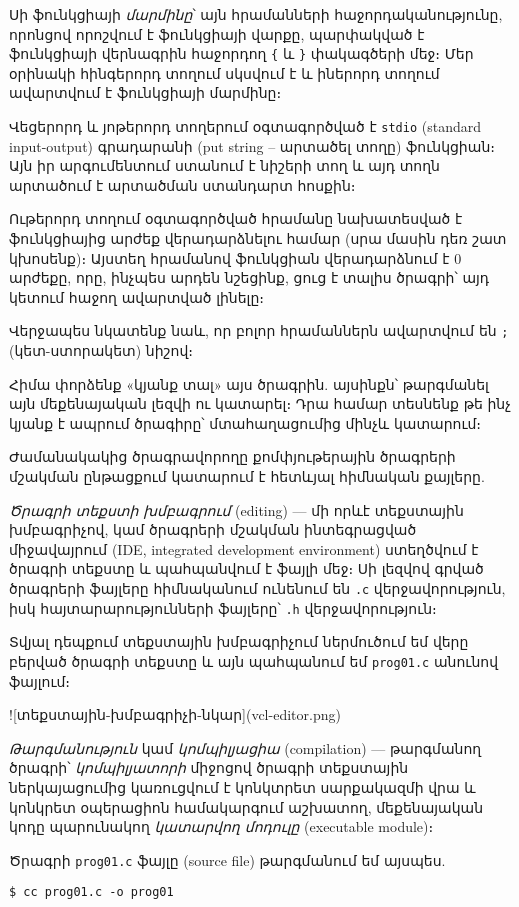 Սի ֆունկցիայի \emph{մարմինը}՝ այն հրամանների հաջորդականությունը,
որոնցով որոշվում է ֆունկցիայի վարքը, պարփակված է ֆունկցիայի
վերնագրին հաջորդող \Verb|{| և \Verb|}| փակագծերի մեջ։ Մեր օրինակի
հինգերորդ տողում սկսվում է և իներորդ տողում ավարտվում է
 ֆունկցիայի մարմինը։

Վեցերորդ և յոթերորդ տողերում օգտագործված է \texttt{stdio}
(standard input-output) գրադարանի  (put string --
արտածել տողը) ֆունկցիան։ Այն իր արգումենտում ստանում է նիշերի
տող և այդ տողն արտածում է  արտածման ստանդարտ հոսքին։

Ութերորդ տողում օգտագործված  հրամանը նախատեսված է
ֆունկցիայից արժեք վերադարձնելու համար (սրա մասին դեռ շատ կխոսենք)։
Այստեղ  հրամանով  ֆունկցիան վերադարձնում
է \(0\) արժեքը, որը, ինչպես արդեն նշեցինք, ցուց է տալիս ծրագրի՝
այդ կետում հաջող ավարտված լինելը։

Վերջապես նկատենք նաև, որ բոլոր հրամաններն ավարտվում են \verb|;|
(կետ-ստորակետ) նիշով։

Հիմա փորձենք «կյանք տալ» այս ծրագրին. այսինքն՝ թարգմանել այն մեքենայական լեզվի ու կատարել։ Դրա համար տեսնենք թե ինչ կյանք է ապրում ծրագիրը՝ մտահաղացումից մինչև կատարում։

Ժամանակակից ծրագրավորողը քոմփյութերային ծրագրերի մշակման ընթացքում կատարում է հետևյալ հիմնական քայլերը.

\emph{Ծրագրի տեքստի խմբագրում} (editing) --- մի որևէ տեքստային խմբագրիչով, կամ ծրագրերի մշակման ինտեգրացված միջավայրում (IDE, integrated development environment) ստեղծվում է ծրագրի տեքստը և պահպանվում է ֆայլի մեջ։ Սի լեզվով գրված ծրագրերի ֆայլերը հիմնականում ունենում են \texttt{.c} վերջավորություն, իսկ հայտարարությունների ֆայլերը՝ \texttt{.h} վերջավորություն։

Տվյալ դեպքում տեքստային խմբագրիչում ներմուծում եմ վերը բերված ծրագրի տեքստը և այն պահպանում եմ \texttt{prog01.c} անունով ֆայլում։

![տեքստային-խմբագրիչի-նկար](vcl-editor.png)

\emph{Թարգմանություն} կամ \emph{կոմպիլյացիա} (compilation) --- թարգմանող ծրագրի՝ \emph{կոմպիլյատորի} միջոցով ծրագրի տեքստային ներկայացումից կառուցվում է կոնկտրետ սարքակազմի վրա և կոնկրետ օպերացիոն համակարգում աշխատող, մեքենայական կոդը պարունակող \emph{կատարվող մոդուլը} (executable module)։

Ծրագրի \texttt{prog01.c} ֆայլը (source file) թարգմանում եմ այսպես.

\begin{Verbatim}
$ cc prog01.c -o prog01
\end{Verbatim}

